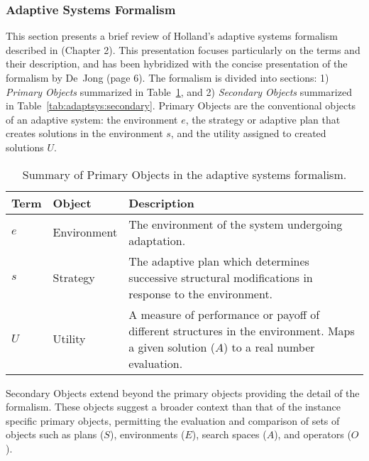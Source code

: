 \subsubsection{Adaptive Systems Formalism}
This section presents a brief review of Holland's adaptive systems formalism described in \cite{Holland1975} (Chapter 2). This presentation focuses particularly on the terms and their description, and has been hybridized with the concise presentation of the formalism by De~Jong \cite{Jong1975} (page 6). The formalism is divided into sections: 1) \emph{Primary Objects} summarized in Table~\ref{tab:adaptsys:primary}, and 2) \emph{Secondary Objects} summarized in Table~\ref{tab:adaptsys:secondary}. Primary Objects are the conventional objects of an adaptive system: the environment $e$, the strategy or adaptive plan that creates solutions in the environment $s$, and the utility assigned to created solutions $U$.

\begin{table}[ht]
	\centering\small
		\begin{tabularx}{\textwidth}{llX}
		\toprule
		\textbf{Term} & \textbf{Object} & \textbf{Description} \\ 
		\toprule
		$e$ & Environment & The environment of the system undergoing adaptation. \\ 
		\midrule
		$s$ & Strategy & The adaptive plan which determines successive structural modifications in response to the environment. \\ 
		\midrule
		$U$ & Utility & A measure of performance or payoff of different structures in the environment. Maps a given solution ($A$) to a real number evaluation. \\ 
		\bottomrule
		\end{tabularx}	
	\caption{Summary of Primary Objects in the adaptive systems formalism.}
	\label{tab:adaptsys:primary}
\end{table}

Secondary Objects extend beyond the primary objects providing the detail of the formalism. These objects suggest a broader context than that of the instance specific primary objects, permitting the evaluation and comparison of sets of objects such as plans ($S$), environments ($E$), search spaces ($A$), and operators ($O$).

